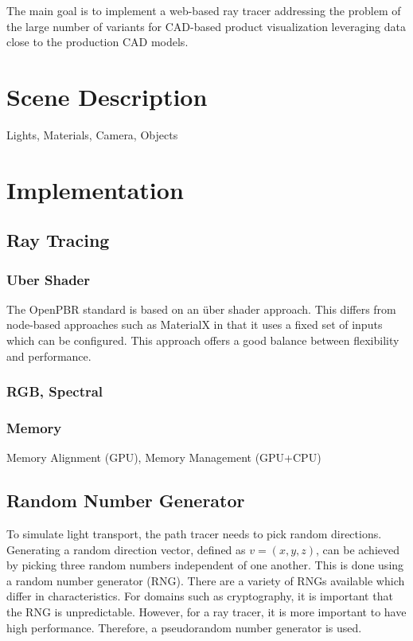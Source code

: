 
The main goal is to implement a web-based ray tracer addressing the problem of the large number of variants for CAD-based product visualization leveraging data close to the production CAD models.

\section{Scene Description}
Lights, Materials, Camera, Objects
\section{Implementation}
\subsection{Ray Tracing}
\subsubsection{Uber Shader}

The OpenPBR standard is based on an über shader approach. This differs from node-based approaches such as MaterialX in that it uses a fixed set of inputs which can be configured. This approach offers a good balance between flexibility and performance.

\subsubsection{RGB, Spectral}
\subsubsection{Memory}

Memory Alignment (GPU), Memory Management (GPU+CPU)

\subsection{Random Number Generator}

To simulate light transport, the path tracer needs to pick random directions. Generating a random direction vector, defined as $v = (x, y, z)$, can be achieved by picking three random numbers independent of one another. This is done using a random number generator (RNG). There are a variety of RNGs available which differ in characteristics. For domains such as cryptography, it is important that the RNG is unpredictable. However, for a ray tracer, it is more important to have high performance. Therefore, a pseudorandom number generator is used.

